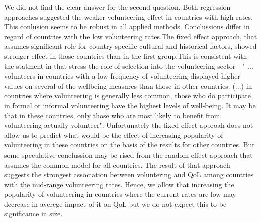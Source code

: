 \documentclass[10pt, letterpaper]{article}
\begin{document}
\begin{spacing}{1.4}
We did not find the clear answer for the second question. Both regression approaches suggested the weaker volunteering effect in countries with high rates. This conlusion seems to be robust in all applied methods. Conclussions differ in regard of countries with the low volunteering rates.The fixed effect approach, that assumes significant role for country specific cultural and historical factors, showed stronger effect in those countries than in the first group.This is consistent with the statment in \citet{plagnol10} that stress the role of selection into the volunteering sector - " ... volunteers in countries with a low frequency of volunteering displayed higher values on several of the wellbeing measures than those in other countries. (...) in countries where volunteering is generally less common, those who do participate in formal or informal volunteering have the highest levels of well-being. It may be that in these countries, only those who are most likely to benefit from volunteering actually volunteer". Unfortunately the fixed effect approah does not allow us to predict what would be the effect of increasing popularity of volunteering in these countries on the basis of the results for other countries. But some speculative conclussion may be rised from the random effect approach that assumes the common model for all countries. The result of that approach suggests the strongest association between voluntering and QoL among countries with the mid-range volunteering rates. Hence, we allow that increasing the popularity of volunteering in countries where the current rates are low may decrease in averege impact of it on QoL but we do not expect this to be significance in size.  \\    


\end{spacing}
\end{document}
